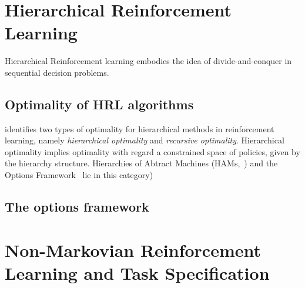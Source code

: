 \section{Hierarchical Reinforcement Learning}
Hierarchical Reinforcement learning embodies the idea of divide-and-conquer in sequential decision problems. 
\subsection{Optimality of HRL algorithms}
\cite{Dietterich2000} identifies two types of optimality for hierarchical methods in reinforcement learning, namely \textit{hierarchical optimality} and \textit{recursive optimality}. Hierarchical optimality implies optimality with regard a constrained space of policies, given by the hierarchy structure. Hierarchies of Abtract Machines (HAMs,~\cite{Parr1997}) and the Options Framework~\citep{Sutton1999} lie in this category) 
\subsection{The options framework}
\label{section:options}

\section{Non-Markovian Reinforcement Learning and Task Specification}

